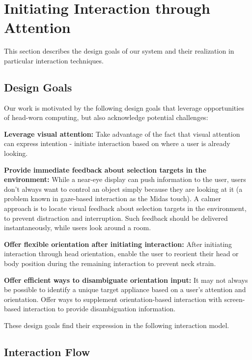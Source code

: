 \section{Initiating Interaction through Attention}
This section describes the design goals of our system and their realization in particular interaction techniques.

\subsection{Design Goals}
Our work is motivated by the following design goals that leverage opportunities of head-worn computing, but also acknowledge potential challenges:

{\bf Leverage visual attention:} Take advantage of the fact that visual attention can express intention - initiate interaction based on where a user is already looking. 

{\bf Provide immediate feedback about selection targets in the environment:} While a near-eye display can push information to the user, users don't always want to control an object simply because they are looking at it (a problem known in gaze-based interaction as the Midas touch). A calmer~\cite{weiser_coming_1997} approach is to locate visual feedback about selection targets in the environment, to prevent distraction and interruption. Such feedback should be delivered instantaneously, while users look around a room.

{\bf Offer flexible orientation after initiating interaction:} After initiating interaction through head orientation, enable the user to reorient their head or body position during the remaining interaction to prevent neck strain.

{\bf Offer efficient ways to disambiguate orientation input:} It may not always be possible to identify a unique target appliance based on a user's attention and orientation. Offer ways to supplement orientation-based interaction with screen-based interaction to provide disambiguation information.

These design goals find their expression in the following interaction model.

\subsection{Interaction Flow}

